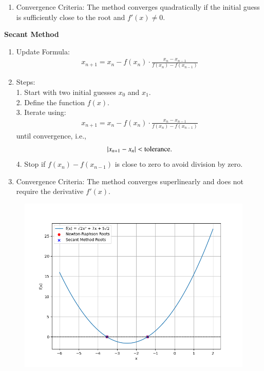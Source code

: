 \documentclass[journal]{IEEEtran}
\numberwithin{equation}{enumi}
\numberwithin{figure}{enumi}
\begin{document}
\begin{enumerate}
\begin{enumerate}
\item Convergence Criteria:
The method converges quadratically if the initial guess is sufficiently close to the root and  $f'(x) \neq 0 $.
\end{enumerate}

\textbf{Secant Method}
\begin{enumerate}
\item{Update Formula:}
\begin{align}
x_{n+1} = x_n - f(x_n) \cdot \frac{x_n - x_{n-1}}{f(x_n) - f(x_{n-1})}    
\end{align}


\item{Steps:}\\
1. Start with two initial guesses $x_0$  and $x_1$.\\
2. Define the function $f(x)$.\\
3. Iterate using:
   \begin{align}
   x_{n+1} = x_n - f(x_n) \cdot \frac{x_n - x_{n-1}}{f(x_n) - f(x_{n-1})}    
   \end{align}
   until convergence, i.e.,
   \begin{align}
   \left\vert x_{n+1} - x_n\right\vert < \text{tolerance}.
   \end{align}
4. Stop if $ f(x_n) - f(x_{n-1}) $ is close to zero to avoid division by zero.

\item{Convergence Criteria:}
The method converges superlinearly and does not require the derivative $ f'(x) $.


\end{enumerate}

\begin{figure}[h!]
   \centering
   \includegraphics[width=0.7\linewidth]{figs/Figure_1.png}
\end{figure}



\end{enumerate}
\end{document}
